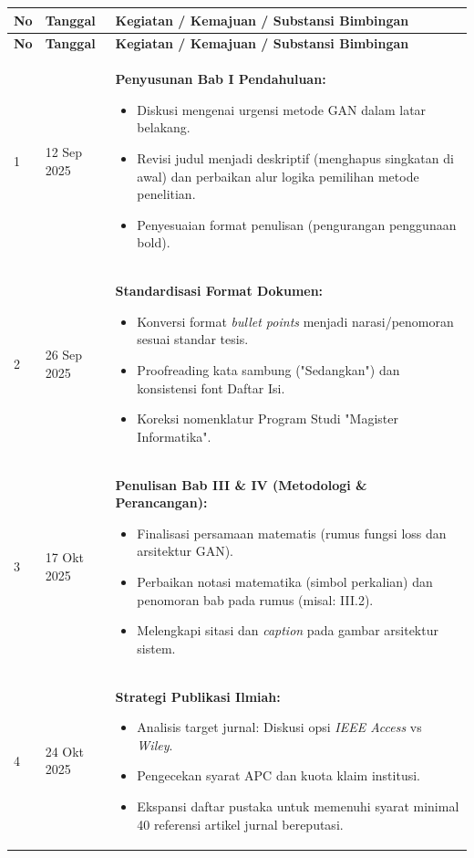\documentclass[a4paper,11pt]{article}
\begin{document}
\begin{longtable}{|C{1cm}|C{3cm}|L{10.5cm}|}
\hline
\textbf{No} & \textbf{Tanggal} & \textbf{Kegiatan / Kemajuan / Substansi Bimbingan} \\
\hline
\endfirsthead
\hline
\textbf{No} & \textbf{Tanggal} & \textbf{Kegiatan / Kemajuan / Substansi Bimbingan} \\
\hline
\endhead

1 & 12 Sep 2025 & \textbf{Penyusunan Bab I Pendahuluan:}
\begin{itemize}[leftmargin=*, noitemsep]
    \item Diskusi mengenai urgensi metode GAN dalam latar belakang.
    \item Revisi judul menjadi deskriptif (menghapus singkatan di awal) dan perbaikan alur logika pemilihan metode penelitian.
    \item Penyesuaian format penulisan (pengurangan penggunaan bold).
\end{itemize} \\
\hline

2 & 26 Sep 2025 & \textbf{Standardisasi Format Dokumen:}
\begin{itemize}[leftmargin=*, noitemsep]
    \item Konversi format \textit{bullet points} menjadi narasi/penomoran sesuai standar tesis.
    \item Proofreading kata sambung ("Sedangkan") dan konsistensi font Daftar Isi.
    \item Koreksi nomenklatur Program Studi "Magister Informatika".
\end{itemize} \\
\hline

3 & 17 Okt 2025 & \textbf{Penulisan Bab III \& IV (Metodologi \& Perancangan):}
\begin{itemize}[leftmargin=*, noitemsep]
    \item Finalisasi persamaan matematis (rumus fungsi loss dan arsitektur GAN).
    \item Perbaikan notasi matematika (simbol perkalian) dan penomoran bab pada rumus (misal: III.2).
    \item Melengkapi sitasi dan \textit{caption} pada gambar arsitektur sistem.
\end{itemize} \\
\hline

4 & 24 Okt 2025 & \textbf{Strategi Publikasi Ilmiah:}
\begin{itemize}[leftmargin=*, noitemsep]
    \item Analisis target jurnal: Diskusi opsi \textit{IEEE Access} vs \textit{Wiley}.
    \item Pengecekan syarat APC dan kuota klaim institusi.
    \item Ekspansi daftar pustaka untuk memenuhi syarat minimal 40 referensi artikel jurnal bereputasi.
\end{itemize} \\
\hline


\end{longtable}
\end{document}
